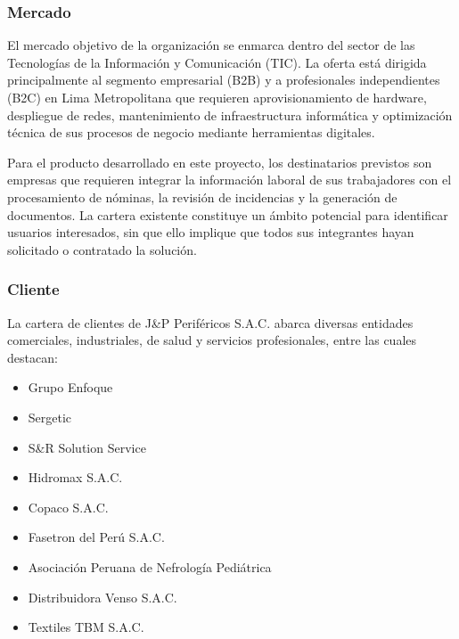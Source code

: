 \subsubsection{Mercado}
El mercado objetivo de la organización se enmarca dentro del sector de las Tecnologías de la Información y Comunicación (TIC). La oferta está dirigida principalmente al segmento empresarial (B2B) y a profesionales independientes (B2C) en Lima Metropolitana que requieren aprovisionamiento de hardware, despliegue de redes, mantenimiento de infraestructura informática y optimización técnica de sus procesos de negocio mediante herramientas digitales.

Para el producto desarrollado en este proyecto, los destinatarios previstos son empresas que requieren integrar la información laboral de sus trabajadores con el procesamiento de nóminas, la revisión de incidencias y la generación de documentos. La cartera existente constituye un ámbito potencial para identificar usuarios interesados, sin que ello implique que todos sus integrantes hayan solicitado o contratado la solución.

\subsubsection{Cliente}
La cartera de clientes de J\&P Periféricos S.A.C. abarca diversas entidades comerciales, industriales, de salud y servicios profesionales, entre las cuales destacan:

\begin{itemize}
    \item Grupo Enfoque
    \item Sergetic
    \item S\&R Solution Service
    \item Hidromax S.A.C.
    \item Copaco S.A.C.
    \item Fasetron del Perú S.A.C.
    \item Asociación Peruana de Nefrología Pediátrica
    \item Distribuidora Venso S.A.C.
    \item Textiles TBM S.A.C.
\end{itemize}